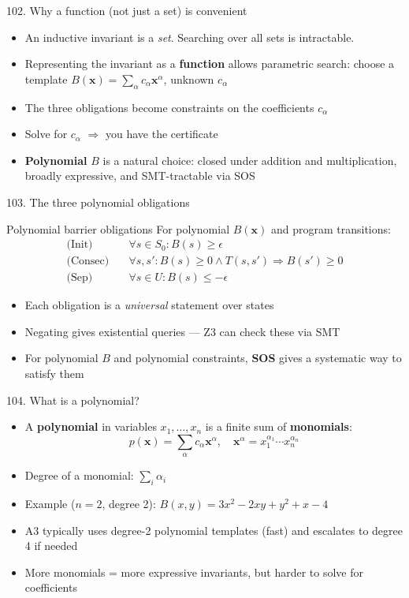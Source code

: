 \documentclass[aspectratio=169]{beamer}
\begin{document}
\begin{frame}{102. Why a function (not just a set) is convenient}
\begin{itemize}
  \item An inductive invariant is a \emph{set}. Searching over all sets is intractable.
  \item Representing the invariant as a \textbf{function} allows parametric search:
    choose a template \(B(\mathbf{x}) = \sum_\alpha c_\alpha \mathbf{x}^\alpha\), unknown $c_\alpha$
  \item The three obligations become constraints on the coefficients \(c_\alpha\)
  \item Solve for \(c_\alpha\) $\Rightarrow$ you have the certificate
  \item \textbf{Polynomial} \(B\) is a natural choice: closed under addition and multiplication, broadly expressive, and SMT-tractable via SOS
\end{itemize}
\end{frame}

\begin{frame}{103. The three polynomial obligations}
\begin{block}{Polynomial barrier obligations}
For polynomial \(B(\mathbf{x})\) and program transitions:
\begin{align*}
\text{(Init)} &\quad \forall s \in S_0: B(s) \ge \epsilon \\
\text{(Consec)} &\quad \forall s, s': B(s)\ge0 \wedge T(s,s') \Rightarrow B(s')\ge0 \\
\text{(Sep)} &\quad \forall s \in U: B(s) \le -\epsilon
\end{align*}
\end{block}
\begin{itemize}
  \item Each obligation is a \emph{universal} statement over states
  \item Negating gives existential queries --- Z3 can check these via SMT
  \item For polynomial \(B\) and polynomial constraints, \textbf{SOS} gives a systematic way to satisfy them
\end{itemize}
\end{frame}

\begin{frame}{104. What is a polynomial?}
\begin{itemize}
  \item A \textbf{polynomial} in variables \(x_1, \ldots, x_n\) is a finite sum of \textbf{monomials}:
    \[p(\mathbf{x}) = \sum_\alpha c_\alpha \mathbf{x}^\alpha, \quad \mathbf{x}^\alpha = x_1^{\alpha_1} \cdots x_n^{\alpha_n}\]
  \item Degree of a monomial: \(\sum_i \alpha_i\)
  \item Example (\(n=2\), degree 2): \(B(x,y) = 3x^2 - 2xy + y^2 + x - 4\)
  \item A3 typically uses degree-2 polynomial templates (fast) and escalates to degree 4 if needed
  \item More monomials = more expressive invariants, but harder to solve for coefficients
\end{itemize}
\end{frame}
\end{document}
